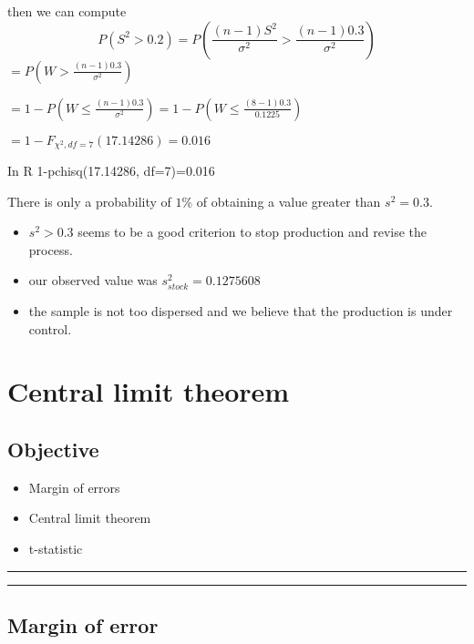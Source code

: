 \documentclass[
]{book}
\providecommand{\tightlist}{%
  \setlength{\itemsep}{0pt}\setlength{\parskip}{0pt}}
\begin{document}
then we can compute \[P(S^2 > 0.2)=P(\frac{(n-1)S^2}{\sigma^2} > \frac{(n-1)0.3}{\sigma^2})\]
\(=P(W > \frac{(n-1)0.3}{\sigma^2})\)

\(=1-P(W \leq \frac{(n-1)0.3}{\sigma^2})=1-P(W\leq \frac{(8-1)0.3}{0.1225})\)

\(= 1- F_{\chi^2,df=7}(17.14286)=0.016\)

In R
1-pchisq(17.14286, df=7)=0.016

There is only a probability of \(1\%\) of obtaining a value greater than \(s^2=0.3\).

\begin{itemize}
\item
  \(s^2>0.3\) seems to be a good criterion to stop production and revise the process.
\item
  our observed value was \(s^2_{stock}=0.1275608\)
\item
  the sample is not too dispersed and we believe that the production is under control.
\end{itemize}

\hypertarget{central-limit-theorem}{%
\chapter{Central limit theorem}\label{central-limit-theorem}}

\hypertarget{objective-10}{%
\section{Objective}\label{objective-10}}

\begin{itemize}
\tightlist
\item
  Margin of errors
\item
  Central limit theorem
\item
  t-statistic
\end{itemize}

\begin{center}\rule{0.5\linewidth}{0.5pt}\end{center}

\begin{center}\rule{0.5\linewidth}{0.5pt}\end{center}

\hypertarget{margin-of-error}{%
\section{Margin of error}\label{margin-of-error}}
\end{document}
